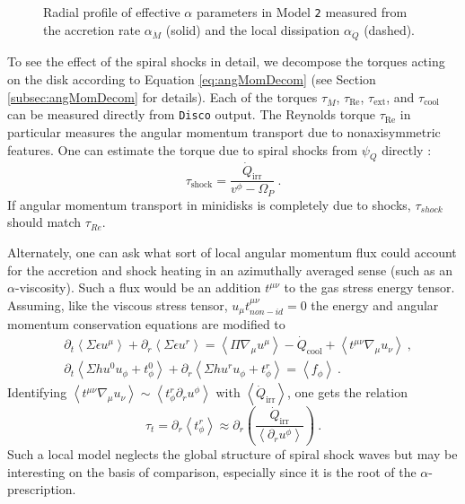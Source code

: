 \documentclass{emulateapj}
\newcommand{\al}{\alpha}
\newcommand{\eps}{\epsilon}
\newcommand{\Sig}{\Sigma}
\newcommand{\Om}{\Omega}
\newcommand{\Disco}{{\texttt{Disco}}}
\newcommand{\model}[1]{{Model \texttt{#1}}}
\newcommand{\ave}[1]{\left \langle #1 \right \rangle}
\begin{document}
\begin{figure}
\caption{\label{fi:alpha} Radial profile of effective $\al$ parameters in \model{2} measured from the accretion rate $\al_{\dot{M}}$ (solid) and the local dissipation $\al_{\dot{Q}}$ (dashed).}
\end{figure}

To see the effect of the spiral shocks in detail, we decompose the torques acting on the disk according to Equation \eqref{eq:angMomDecom} (see Section \ref{subsec:angMomDecom} for details). Each of the torques $\tau_{\dot{M}}$, $\tau_\text{Re}$, $\tau_\text{ext}$, and $\tau_\text{cool}$ can be measured directly from \Disco{} output.  The Reynolds torque $\tau_\text{Re}$ in particular measures the angular momentum transport due to nonaxisymmetric features.  One can estimate the torque due to spiral shocks from $\psi_Q$ directly \citep{Rafikov16}:
\begin{equation}
	\tau_\text{shock} = \frac{\dot{Q}_\text{irr}}{v^\phi - \Om_P} \ . \label{eq:tauRaf}
\end{equation}
If angular momentum transport in minidisks is completely due to shocks, $\tau_{shock}$ should match $\tau_{Re}$.

Alternately, one can ask what sort of local angular momentum flux could account for the accretion and shock heating in an azimuthally averaged sense (such as an $\al$-viscosity).  Such a flux would be an addition $t^{\mu\nu}$ to the gas stress energy tensor.  Assuming, like the viscous stress tensor, $u_\mu t^{\mu\nu}_{non-id} = 0$ the energy and angular momentum conservation equations are modified to
\begin{align}
	&\partial_t \ave{\Sig \eps u^\mu} + \partial_r \ave{\Sig \eps u^r} = \ave{\Pi \nabla_\mu u^\mu} - \dot{Q}_\text{cool} + \ave{t^{\mu\nu} \nabla_\mu u_\nu} \ ,\\
	&\partial_t \ave{\Sig h u^0 u_\phi + t^0_\phi} + \partial_r \ave{\Sig h u^r u_\phi + t^r_\phi} = \ave{f_\phi} \ .
\end{align}
Identifying $\ave{t^{\mu\nu} \nabla_\mu u_\nu} \sim \ave{t^r_\phi \partial_r u^\phi}$ with $\ave{\dot{Q}_\text{irr}}$, one gets the relation
\begin{equation}
	\tau_{t} = \partial_r \ave{t^r_\phi} \approx \partial_r \left(\frac{\dot{Q}_\text{irr}}{\ave{\partial_r u^\phi}} \right)\ . \label{eq:tauLoc}
\end{equation}
Such a local model neglects the global structure of spiral shock waves but may be interesting on the basis of comparison,  especially since it is the root of the $\alpha$-prescription.
\end{document}
